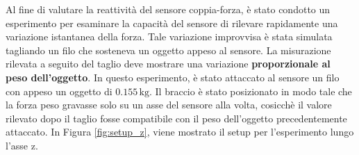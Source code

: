 Al fine di valutare la reattivit\`{a} del sensore coppia-forza, \`{e} stato condotto un esperimento per esaminare la capacit\`{a} del 
sensore di rilevare rapidamente una variazione istantanea della forza. 
Tale variazione improvvisa \`{e} stata simulata 
tagliando un filo che sosteneva un oggetto appeso al sensore. La misurazione rilevata a seguito del taglio  
deve mostrare una variazione \textbf{proporzionale al peso dell'oggetto}.
In questo esperimento, \`{e} stato attaccato al sensore un filo con appeso un oggetto di $0.155 \, \text{kg}$. 
Il braccio \`{e} stato posizionato in modo tale che la forza peso gravasse solo su un asse del sensore alla volta, cosicch\`{e} 
il valore rilevato dopo il taglio fosse compatibile con il peso dell'oggetto precedentemente attaccato. 
In Figura \ref{fig:setup_z}, viene mostrato il setup per l'esperimento lungo l'asse z. 

